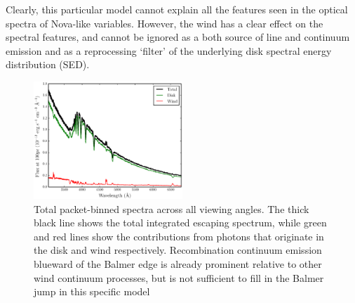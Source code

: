 \documentclass[preprint, a4paper, 11pt]{aastex}
\begin{document}
Clearly, this particular model cannot explain all
the features seen in the optical spectra of Nova-like variables. However,
the wind has a clear effect on the spectral features, and cannot be ignored as 
a both source of line and continuum emission and as a reprocessing `filter'
of the underlying disk spectral energy distribution (SED).



\begin{figure} 
\includegraphics[width=0.5\textwidth]{figures/fig7_escaping.eps}
\caption{Total packet-binned spectra across all viewing angles. 
The thick black line shows the total 
integrated escaping spectrum, while green and red lines show the contributions from photons that originate
in the disk and wind respectively. Recombination continuum emission blueward of the Balmer 
edge is already prominent relative to other wind continuum processes, but is not sufficient
to fill in the Balmer jump in this specific model}
\label{cont}
\end{figure} 

\end{document}
